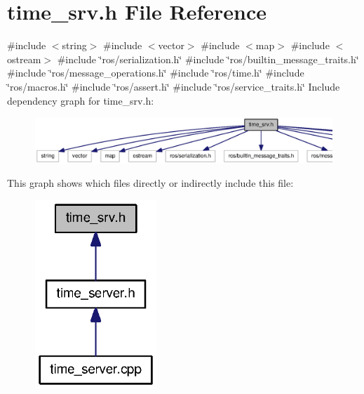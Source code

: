\section{time\-\_\-srv.\-h \-File \-Reference}
\label{time__srv_8h}
{\ttfamily \#include $<$string$>$}\*
{\ttfamily \#include $<$vector$>$}\*
{\ttfamily \#include $<$map$>$}\*
{\ttfamily \#include $<$ostream$>$}\*
{\ttfamily \#include \char`\"{}ros/serialization.\-h\char`\"{}}\*
{\ttfamily \#include \char`\"{}ros/builtin\-\_\-message\-\_\-traits.\-h\char`\"{}}\*
{\ttfamily \#include \char`\"{}ros/message\-\_\-operations.\-h\char`\"{}}\*
{\ttfamily \#include \char`\"{}ros/time.\-h\char`\"{}}\*
{\ttfamily \#include \char`\"{}ros/macros.\-h\char`\"{}}\*
{\ttfamily \#include \char`\"{}ros/assert.\-h\char`\"{}}\*
{\ttfamily \#include \char`\"{}ros/service\-\_\-traits.\-h\char`\"{}}\*
\-Include dependency graph for time\-\_\-srv.\-h\-:\nopagebreak
\begin{figure}[H]
\begin{center}
\leavevmode
\includegraphics[width=350pt]{time__srv_8h__incl}
\end{center}
\end{figure}
\-This graph shows which files directly or indirectly include this file\-:\nopagebreak
\begin{figure}[H]
\begin{center}
\leavevmode
\includegraphics[width=130pt]{time__srv_8h__dep__incl}
\end{center}
\end{figure}
